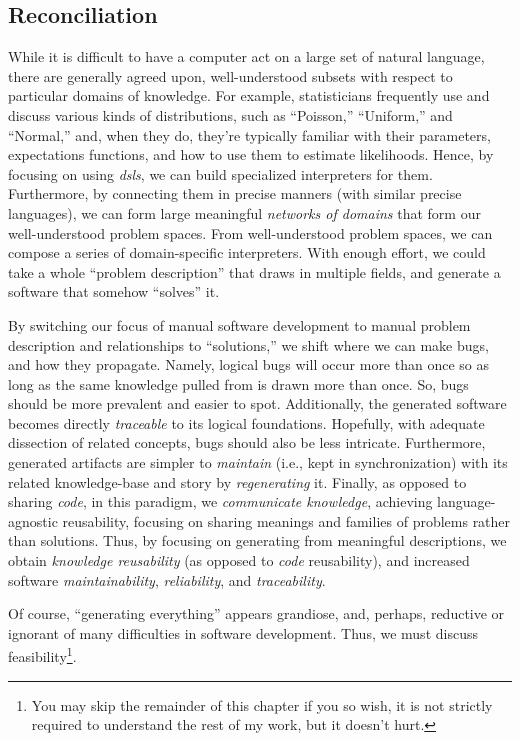 \subsection{Reconciliation}
\label{chap:ideology:sec:thoughts_of_generation:subsec:reconciliation}

While it is difficult to have a computer act on a large set of natural language,
there are generally agreed upon, well-understood subsets \cite{well-understood}
with respect to particular domains of knowledge. For example, statisticians
frequently use and discuss various kinds of distributions, such as ``Poisson,''
``Uniform,'' and ``Normal,'' and, when they do, they're typically familiar with
their parameters, expectations functions, and how to use them to estimate
likelihoods. Hence, by focusing on using \textit{\aclp{dsl}}, we can build
specialized interpreters for them. Furthermore, by connecting them in precise
manners (with similar precise languages), we can form large meaningful
\textit{networks of domains} \cite{Czarnecki2005} that form our well-understood
problem spaces. From well-understood problem spaces, we can compose a series of
domain-specific interpreters. With enough effort, we could take a whole
``problem description'' that draws in multiple fields, and generate a software
that somehow ``solves'' it. 

By switching our focus of manual software development to manual problem
description and relationships to ``solutions,'' we shift where we can make bugs,
and how they propagate. Namely, logical bugs will occur more than once so as
long as the same knowledge pulled from is drawn more than once. So, bugs should
be more prevalent and easier to spot. Additionally, the generated software
becomes directly \textit{traceable} to its logical foundations. Hopefully, with
adequate dissection of related concepts, bugs should also be less intricate.
Furthermore, generated artifacts are simpler to \textit{maintain} (i.e., kept in
synchronization) with its related knowledge-base and story by
\textit{regenerating} it. Finally, as opposed to sharing \textit{code}, in this
paradigm, we \textit{communicate knowledge}, achieving language-agnostic
reusability, focusing on sharing meanings and families of problems rather than
solutions. Thus, by focusing on generating from meaningful descriptions, we
obtain \textit{knowledge reusability} (as opposed to \textit{code} reusability),
and increased software \textit{maintainability}, \textit{reliability}, and
\textit{traceability}.

Of course, ``generating everything'' appears grandiose, and, perhaps, reductive
or ignorant of many difficulties in software development. Thus, we must discuss
feasibility\footnote{You may skip the remainder of this chapter if you so wish,
it is not strictly required to understand the rest of my work, but it doesn't
hurt.}.

